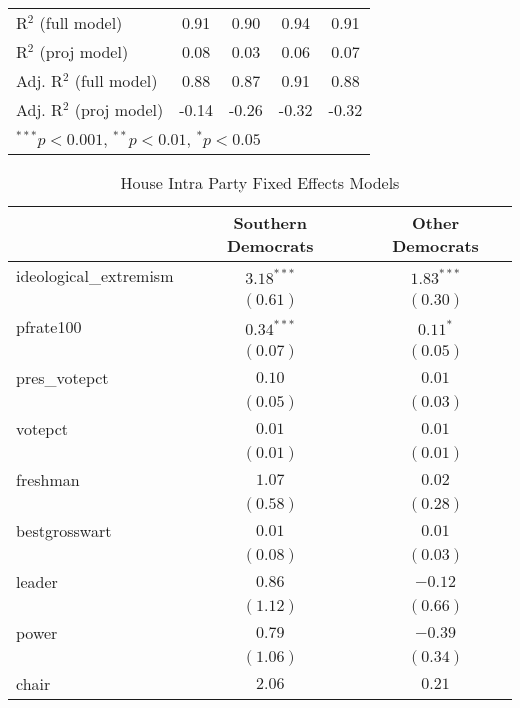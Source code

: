\documentclass[12pt]{article}
\begin{document}
\begin{table}[H]
\begin{center}
\begin{tabular}{l c c c c }
			R$^2$ (full model)      & 0.91         & 0.90         & 0.94         & 0.91         \\
			R$^2$ (proj model)      & 0.08         & 0.03         & 0.06         & 0.07         \\
			Adj. R$^2$ (full model) & 0.88         & 0.87         & 0.91         & 0.88         \\
			Adj. R$^2$ (proj model) & -0.14        & -0.26        & -0.32        & -0.32        \\
			\hline
			\multicolumn{5}{l}{\scriptsize{$^{***}p<0.001$, $^{**}p<0.01$, $^*p<0.05$}}
		\end{tabular}
	\end{center}
\end{table}

\begin{table}
	\begin{center}
		\caption{House Intra Party Fixed Effects Models}
		\begin{tabular}{l c c }
			\hline
			& Southern Democrats & Other Democrats \\
			\hline
			ideological\_extremism  & $3.18^{***}$ & $1.83^{***}$ \\
			& $(0.61)$     & $(0.30)$     \\
			pfrate100               & $0.34^{***}$ & $0.11^{*}$   \\
			& $(0.07)$     & $(0.05)$     \\
			pres\_votepct           & $0.10$       & $0.01$       \\
			& $(0.05)$     & $(0.03)$     \\
			votepct                 & $0.01$       & $0.01$       \\
			& $(0.01)$     & $(0.01)$     \\
			freshman                & $1.07$       & $0.02$       \\
			& $(0.58)$     & $(0.28)$     \\
			bestgrosswart           & $0.01$       & $0.01$       \\
			& $(0.08)$     & $(0.03)$     \\
			leader                  & $0.86$       & $-0.12$      \\
			& $(1.12)$     & $(0.66)$     \\
			power                   & $0.79$       & $-0.39$      \\
			& $(1.06)$     & $(0.34)$     \\
			chair                   & $2.06$       & $0.21$       \\

\end{tabular}
\end{center}
\end{table}
\end{document}
